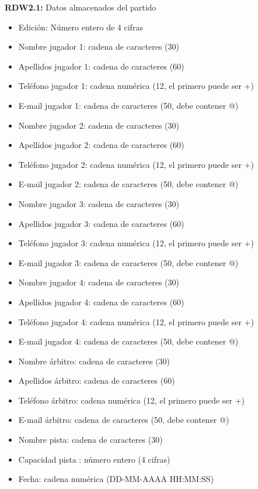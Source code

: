 \textbf{RDW2.1:} Datos almacenados del partido
\begin{itemize}
	\item Edición: Número entero de 4 cifras
\newline
	\item Nombre jugador 1: cadena de caracteres (30)
	\item Apellidos jugador 1: cadena de caracteres (60)
	\item Teléfono jugador 1: cadena numérica (12, el primero puede ser +)
	\item E-mail jugador 1: cadena de caracteres (50, debe contener @)
\newline
	\item Nombre jugador 2: cadena de caracteres (30)
	\item Apellidos jugador 2: cadena de caracteres (60)
	\item Teléfono jugador 2: cadena numérica (12, el primero puede ser +)
	\item E-mail jugador 2: cadena de caracteres (50, debe contener @)
\newline
	\item Nombre jugador 3: cadena de caracteres (30)
	\item Apellidos jugador 3: cadena de caracteres (60)
	\item Teléfono jugador 3: cadena numérica (12, el primero puede ser +)
	\item E-mail jugador 3: cadena de caracteres (50, debe contener @)
\newline
	\item Nombre jugador 4: cadena de caracteres (30)
	\item Apellidos jugador 4: cadena de caracteres (60)
	\item Teléfono jugador 4: cadena numérica (12, el primero puede ser +)
	\item E-mail jugador 4: cadena de caracteres (50, debe contener @)
\newline
	\item Nombre árbitro: cadena de caracteres (30)
	\item Apellidos árbitro: cadena de caracteres (60)
	\item Teléfono árbitro: cadena numérica (12, el primero puede ser +)
	\item E-mail árbitro: cadena de caracteres (50, debe contener @)
\newline
	\item Nombre pista: cadena de caracteres (30)
	\item Capacidad pista : número entero (4 cifras)
	\item Fecha: cadena numérica (DD-MM-AAAA HH:MM:SS)
\end{itemize}

